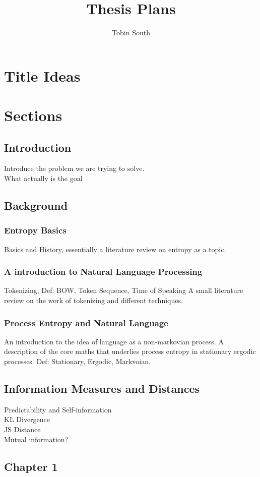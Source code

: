 \documentclass[12pt,a4paper]{article}
\title{Thesis Plans}
\author{Tobin South}
\begin{document}
\maketitle

\section{Title Ideas}

\section{Sections}
\subsection{Introduction}
Introduce the problem we are trying to solve. \\
What actually is the goal\\
\subsection{Background}
\subsubsection{Entropy Basics}
Basics and History, essentially a literature review on entropy as a topic.
\subsubsection{A introduction to Natural Language Processing}
Tokenizing, Def: BOW, Token Sequence, Time of Speaking
A small literature review on the work of tokenizing and different techniques.
\subsubsection{Process Entropy and Natural Language}
An introduction to the idea of language as a non-markovian process. A description of the core maths that underlies process entropy in stationary ergodic processes. Def: Stationary, Ergodic, Markvoian.
\subsection{Information Measures and Distances}
Predictability and Self-information\\
KL Divergence \\
JS Distance \\
Mutual information?
\subsection{Chapter 1}
\end{document}
